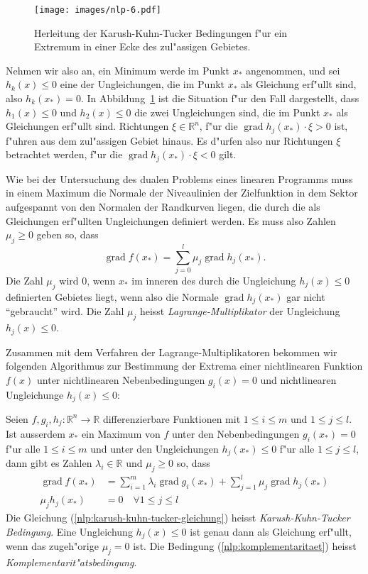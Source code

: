 \begin{figure}
\begin{center}
\texttt{[image: images/nlp-6.pdf]}
\end{center}
\caption{Herleitung der Karush-Kuhn-Tucker Bedingungen f"ur ein Extremum
in einer Ecke des zul"assigen Gebietes.
\label{nlp:kkt-ableitung}}
\end{figure}
Nehmen wir also an, ein Minimum werde im Punkt $x_*$ angenommen,
und sei $h_k(x)\le 0$ eine der Ungleichungen, die im Punkt $x_*$ 
als Gleichung erf"ullt sind, also $h_k(x_*)=0$.
In Abbildung~\ref{nlp:kkt-ableitung} ist die Situation f"ur den
Fall dargestellt, dass $h_1(x)\le 0$ und $h_2(x)\le0$ die zwei
Ungleichungen sind, die im Punkt $x_*$ als Gleichungen erf"ullt
sind.
Richtungen $\xi\in\mathbb R^n$, f"ur die
$\operatorname{grad}h_j(x_*)\cdot\xi > 0$ ist,
f"uhren aus dem zul"assigen Gebiet hinaus. Es d"urfen also nur Richtungen
$\xi$ betrachtet werden, f"ur die $\operatorname{grad}h_j(x_*)\cdot\xi <0$
gilt.

Wie bei der Untersuchung des dualen Problems eines linearen Programms
muss in einem Maximum die Normale der Niveaulinien der Zielfunktion 
in dem Sektor aufgespannt von den Normalen der Randkurven liegen,
die durch die als Gleichungen erf"ullten Ungleichungen definiert
werden. Es muss also Zahlen $\mu_j\ge 0$ geben so, dass
\[
\operatorname{grad}f(x_*)=\sum_{j=0}^l\mu_j\operatorname{grad}h_j(x_*).
\]
Die Zahl $\mu_j$ wird $0$, wenn $x_*$ im inneren des durch die Ungleichung
$h_j(x)\le 0$ definierten Gebietes liegt, wenn also die Normale
$\operatorname{grad}h_j(x_*)$ gar nicht ``gebraucht'' wird.
Die Zahl $\mu_j$ heisst {\em Lagrange-Multiplikator} der
Ungleichung $h_j(x)\le 0$.

Zusammen mit dem Verfahren der Lagrange-Multiplikatoren bekommen wir 
folgenden Algorithmus zur Bestimmung der Extrema einer nichtlinearen
Funktion $f(x)$ unter nichtlinearen Nebenbedingungen $g_i(x)=0$
und nichtlinearen Ungleichunge $h_j(x)\le 0$:

\begin{satz}
Seien $f, g_i, h_j\colon\mathbb R^n\to \mathbb R$ differenzierbare Funktionen
mit $1\le i\le m$ und $1\le j\le l$.
Ist ausserdem $x_*$ ein Maximum von $f$ unter
den Nebenbedingungen $g_i(x_*)=0$ f"ur alle $1\le i\le m$ und unter den
Ungleichungen $h_j(x_*)\le 0$ f"ur alle $1\le j\le l$, dann gibt es
Zahlen $\lambda_i\in\mathbb R$ und $\mu_j\ge 0$ so, dass
\begin{align}
\operatorname{grad}f(x_*)
&=
\sum_{i=1}^m\lambda_i \operatorname{grad}g_i(x_*)
+
\sum_{j=1}^l\mu_j \operatorname{grad}h_j(x_*)
\label{nlp:karush-kuhn-tucker-gleichung}
\\
\mu_jh_j(x_*)&=0\quad \forall 1\le j\le l
\label{nlp:komplementaritaet}
\end{align}
Die Gleichung (\ref{nlp:karush-kuhn-tucker-gleichung}) heisst
{\em Karush-Kuhn-Tucker Bedingung}.
Eine Ungleichung $h_j(x)\le 0$ ist genau dann als Gleichung erf"ullt,
wenn das zugeh"orige $\mu_j=0$ ist.
Die Bedingung (\ref{nlp:komplementaritaet})
heisst {\em Komplementarit"atsbedingung}.
\end{satz}

